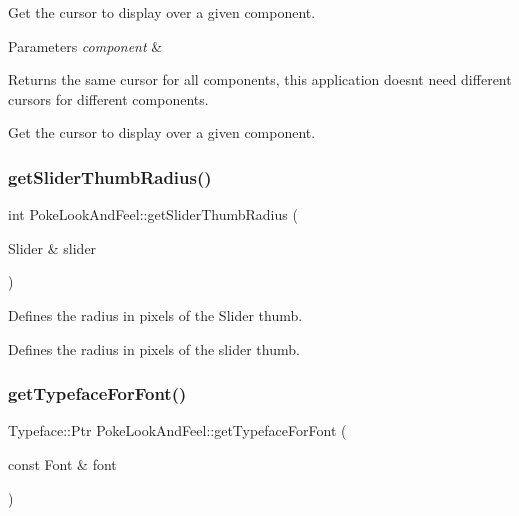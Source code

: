 Get the cursor to display over a given component.


\begin{DoxyParams}{Parameters}
{\em component} & \\
\hline
\end{DoxyParams}
\begin{DoxyReturn}{Returns}
the same cursor for all components, this application doesn\textquotesingle{}t need different cursors for different components.
\end{DoxyReturn}
Get the cursor to display over a given component. \mbox{\label{classPokeLookAndFeel_af749b4f0ffd0e97a1e9bfb307fe9e20b}} 
\subsubsection{\texorpdfstring{get\+Slider\+Thumb\+Radius()}{getSliderThumbRadius()}}
{\footnotesize\ttfamily int Poke\+Look\+And\+Feel\+::get\+Slider\+Thumb\+Radius (\begin{DoxyParamCaption}\item[{Slider \&}]{slider }\end{DoxyParamCaption})\hspace{0.3cm}{\ttfamily [override]}}

Defines the radius in pixels of the Slider thumb.

Defines the radius in pixels of the slider thumb. \mbox{\label{classPokeLookAndFeel_aa031452148cb5c6cb5d4a6c9e6db2fb8}} 
\subsubsection{\texorpdfstring{get\+Typeface\+For\+Font()}{getTypefaceForFont()}}
{\footnotesize\ttfamily Typeface\+::\+Ptr Poke\+Look\+And\+Feel\+::get\+Typeface\+For\+Font (\begin{DoxyParamCaption}\item[{const Font \&}]{font }\end{DoxyParamCaption})\hspace{0.3cm}{\ttfamily [override]}}

